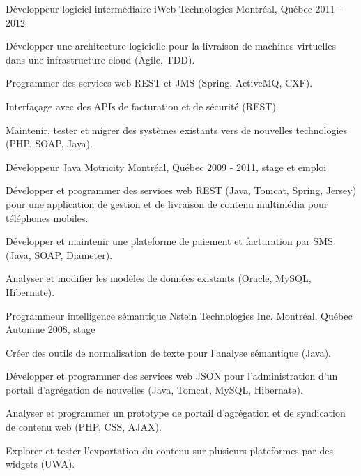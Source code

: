 \begin{cventries}
  \cventry
    {Développeur logiciel intermédiaire} %
    {iWeb Technologies} %
    {Montréal, Québec} %
    {2011 - 2012} %
    {
      \begin{cvitems} %
        \item {Développer une architecture logicielle pour la livraison de machines virtuelles dans une infrastructure cloud (Agile, TDD).}
        \item {Programmer des services web REST et JMS (Spring, ActiveMQ, CXF).}
        \item {Interfaçage avec des APIs de facturation et de sécurité (REST).}
        \item {Maintenir, tester et migrer des systèmes existants vers de nouvelles technologies (PHP, SOAP, Java).}
      \end{cvitems}
    }

  \cventry
    {Développeur Java} %
    {Motricity} %
    {Montréal, Québec} %
    {2009 - 2011, stage et emploi} %
    {
      \begin{cvitems} %
        \item {Développer et programmer des services web REST (Java, Tomcat, Spring, Jersey) pour une application de gestion et de livraison de contenu multimédia pour téléphones mobiles.}
        \item {Développer et maintenir une plateforme de paiement et facturation par SMS (Java, SOAP, Diameter).}
        \item {Analyser et modifier les modèles de données existants (Oracle, MySQL, Hibernate).}
      \end{cvitems}
    }

  \cventry
    {Programmeur intelligence sémantique} %
    {Nstein Technologies Inc.} %
    {Montréal, Québec} %
    {Automne 2008, stage} %
    {
      \begin{cvitems} %
        \item {Créer des outils de normalisation de texte pour l’analyse sémantique (Java).}
        \item {Développer et programmer des services web JSON pour l’administration d’un portail d’agrégation de nouvelles (Java, Tomcat, MySQL, Hibernate).}
        \item {Analyser et programmer un prototype de portail d’agrégation et de syndication de contenu web (PHP, CSS, AJAX).}
        \item {Explorer et tester l’exportation du contenu sur plusieurs plateformes par des widgets (UWA).}
      \end{cvitems}
    }

\end{cventries}